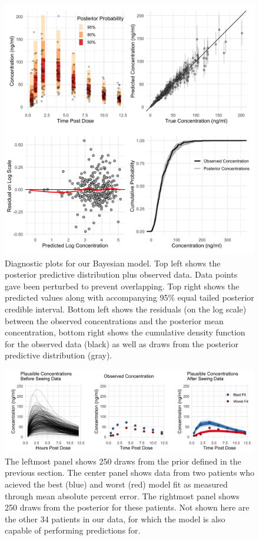 \begin{figure}
	\centering
	\includegraphics[width=0.9\linewidth]{figs/diagnostics}
	\caption{Diagnostic plots for our Bayesian model.  Top left shows the posterior predictive distribution plus observed data.  Data points gave been perturbed to prevent overlapping. Top right shows the predicted values along with accompanying 95\% equal tailed posterior credible interval. Bottom left shows the residuals (on the log scale) between the observed concentrations and the posterior mean concentration, bottom right shows the cumulative density function for the observed data (black) as well as draws from the posterior predictive distribution (gray).}
	\label{fig:fig3}
\end{figure}


\begin{figure}
	\centering
	\includegraphics[width=\linewidth]{figs/fig3}
	\caption{The leftmost panel shows 250 draws from the prior defined in the previous section.  The center panel shows data from two patients who acieved the best (blue) and worst (red) model fit as measured through mean absolute percent error.  The rightmost panel shows 250 draws from the posterior for these patients.  Not shown here are the other 34 patients in our data, for which the model is also capable of performing predictions for. }
	\label{fig:fig4}
\end{figure}


